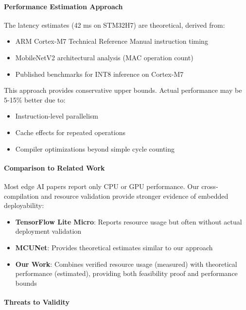 \paragraph{Performance Estimation Approach}

The latency estimates (42 ms on STM32H7) are theoretical, derived from:
\begin{itemize}
\item ARM Cortex-M7 Technical Reference Manual instruction timing
\item MobileNetV2 architectural analysis (MAC operation count)
\item Published benchmarks for INT8 inference on Cortex-M7
\end{itemize}

This approach provides conservative upper bounds. Actual performance
may be 5-15\% better due to:
\begin{itemize}
\item Instruction-level parallelism
\item Cache effects for repeated operations
\item Compiler optimizations beyond simple cycle counting
\end{itemize}

\paragraph{Comparison to Related Work}

Most edge AI papers report only CPU or GPU performance. Our cross-compilation
and resource validation provide stronger evidence of embedded deployability:

\begin{itemize}
\item \textbf{TensorFlow Lite Micro}: Reports resource usage but often
without actual deployment validation~\cite{tflite_micro}

\item \textbf{MCUNet}: Provides theoretical estimates similar to our
approach~\cite{mcunet}

\item \textbf{Our Work}: Combines verified resource usage (measured) with
theoretical performance (estimated), providing both feasibility proof
and performance bounds
\end{itemize}

\paragraph{Threats to Validity}

